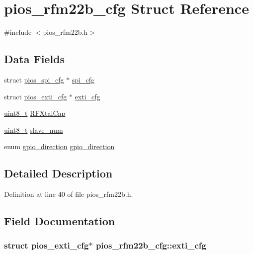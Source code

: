 \hypertarget{structpios__rfm22b__cfg}{\section{pios\-\_\-rfm22b\-\_\-cfg Struct Reference}
\label{structpios__rfm22b__cfg}
}


{\ttfamily \#include $<$pios\-\_\-rfm22b.\-h$>$}

\subsection*{Data Fields}
\begin{DoxyCompactItemize}
\item 
struct \hyperlink{structpios__spi__cfg}{pios\-\_\-spi\-\_\-cfg} $\ast$ \hyperlink{structpios__rfm22b__cfg_aa6c10909092b21bbdec314781785bf5d}{spi\-\_\-cfg}
\item 
struct \hyperlink{structpios__exti__cfg}{pios\-\_\-exti\-\_\-cfg} $\ast$ \hyperlink{structpios__rfm22b__cfg_af86691ce02d622888addd9f0474ef4ec}{exti\-\_\-cfg}
\item 
\hyperlink{stdint_8h_aba7bc1797add20fe3efdf37ced1182c5}{uint8\-\_\-t} \hyperlink{structpios__rfm22b__cfg_a20784354b27515bed19c3fa02b880a10}{R\-F\-Xtal\-Cap}
\item 
\hyperlink{stdint_8h_aba7bc1797add20fe3efdf37ced1182c5}{uint8\-\_\-t} \hyperlink{structpios__rfm22b__cfg_a71f36f077e13645e984cb88f10e2fa0e}{slave\-\_\-num}
\item 
enum \hyperlink{group___p_i_o_s___r_f_m22_b_gaccc7d029df9e5a96151a68e64f4be7e2}{gpio\-\_\-direction} \hyperlink{structpios__rfm22b__cfg_ac8a55d600d26585b2fb4d58c4e197f9b}{gpio\-\_\-direction}
\end{DoxyCompactItemize}


\subsection{Detailed Description}


Definition at line 40 of file pios\-\_\-rfm22b.\-h.



\subsection{Field Documentation}
\hypertarget{structpios__rfm22b__cfg_af86691ce02d622888addd9f0474ef4ec}{
\subsubsection[{exti\-\_\-cfg}]{\setlength{\rightskip}{0pt plus 5cm}struct {\bf pios\-\_\-exti\-\_\-cfg}$\ast$ pios\-\_\-rfm22b\-\_\-cfg\-::exti\-\_\-cfg}}\label{structpios__rfm22b__cfg_af86691ce02d622888addd9f0474ef4ec}



